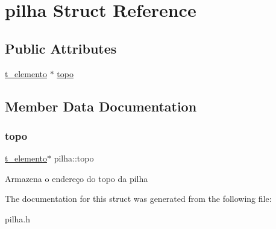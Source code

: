 \hypertarget{structpilha}{}\section{pilha Struct Reference}
\label{structpilha}
\subsection*{Public Attributes}
\begin{DoxyCompactItemize}
\item 
\mbox{\hyperlink{structelemento}{t\+\_\+elemento}} $\ast$ \mbox{\hyperlink{structpilha_ac636e723ce248e1789b4c79c51c7ab97}{topo}}
\end{DoxyCompactItemize}


\subsection{Member Data Documentation}
\mbox{\label{structpilha_ac636e723ce248e1789b4c79c51c7ab97}} 
\subsubsection{\texorpdfstring{topo}{topo}}
{\footnotesize\ttfamily \mbox{\hyperlink{structelemento}{t\+\_\+elemento}}$\ast$ pilha\+::topo}

Armazena o endereço do topo da pilha 

The documentation for this struct was generated from the following file\+:\begin{DoxyCompactItemize}
\item 
pilha.\+h\end{DoxyCompactItemize}
